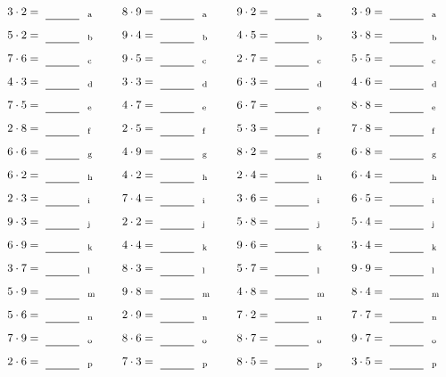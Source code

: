 \documentclass
[
  draft    = true,
  fontsize = 11pt,
  parskip  = half-
]
{scrartcl}
\begin{document}
\par\vfill\par
\begin{align*}
    \pline{3\cdot2}&=\rline{a}
  & \pline{8\cdot9}&=\rline{a}
  & \pline{9\cdot2}&=\rline{a}
  & \pline{3\cdot9}&=\rline{a} \\[1ex]
    \pline{5\cdot2}&=\rline{b}
  & \pline{9\cdot4}&=\rline{b}
  & \pline{4\cdot5}&=\rline{b}
  & \pline{3\cdot8}&=\rline{b} \\[1ex]
    \pline{7\cdot6}&=\rline{c}
  & \pline{9\cdot5}&=\rline{c}
  & \pline{2\cdot7}&=\rline{c}
  & \pline{5\cdot5}&=\rline{c} \\[1ex]
    \pline{4\cdot3}&=\rline{d}
  & \pline{3\cdot3}&=\rline{d}
  & \pline{6\cdot3}&=\rline{d}
  & \pline{4\cdot6}&=\rline{d} \\[1ex]
    \pline{7\cdot5}&=\rline{e}
  & \pline{4\cdot7}&=\rline{e}
  & \pline{6\cdot7}&=\rline{e}
  & \pline{8\cdot8}&=\rline{e} \\[1ex]
    \pline{2\cdot8}&=\rline{f}
  & \pline{2\cdot5}&=\rline{f}
  & \pline{5\cdot3}&=\rline{f}
  & \pline{7\cdot8}&=\rline{f} \\[1ex]
    \pline{6\cdot6}&=\rline{g}
  & \pline{4\cdot9}&=\rline{g}
  & \pline{8\cdot2}&=\rline{g}
  & \pline{6\cdot8}&=\rline{g} \\[1ex]
    \pline{6\cdot2}&=\rline{h}
  & \pline{4\cdot2}&=\rline{h}
  & \pline{2\cdot4}&=\rline{h}
  & \pline{6\cdot4}&=\rline{h} \\[1ex]
    \pline{2\cdot3}&=\rline{i}
  & \pline{7\cdot4}&=\rline{i}
  & \pline{3\cdot6}&=\rline{i}
  & \pline{6\cdot5}&=\rline{i} \\[1ex]
    \pline{9\cdot3}&=\rline{j}
  & \pline{2\cdot2}&=\rline{j}
  & \pline{5\cdot8}&=\rline{j}
  & \pline{5\cdot4}&=\rline{j} \\[1ex]
    \pline{6\cdot9}&=\rline{k}
  & \pline{4\cdot4}&=\rline{k}
  & \pline{9\cdot6}&=\rline{k}
  & \pline{3\cdot4}&=\rline{k} \\[1ex]
    \pline{3\cdot7}&=\rline{l}
  & \pline{8\cdot3}&=\rline{l}
  & \pline{5\cdot7}&=\rline{l}
  & \pline{9\cdot9}&=\rline{l} \\[1ex]
    \pline{5\cdot9}&=\rline{m}
  & \pline{9\cdot8}&=\rline{m}
  & \pline{4\cdot8}&=\rline{m}
  & \pline{8\cdot4}&=\rline{m} \\[1ex]
    \pline{5\cdot6}&=\rline{n}
  & \pline{2\cdot9}&=\rline{n}
  & \pline{7\cdot2}&=\rline{n}
  & \pline{7\cdot7}&=\rline{n} \\[1ex]
    \pline{7\cdot9}&=\rline{o}
  & \pline{8\cdot6}&=\rline{o}
  & \pline{8\cdot7}&=\rline{o}
  & \pline{9\cdot7}&=\rline{o} \\[1ex]
    \pline{2\cdot6}&=\rline{p}
  & \pline{7\cdot3}&=\rline{p}
  & \pline{8\cdot5}&=\rline{p}
  & \pline{3\cdot5}&=\rline{p}
\end{align*}
\end{document}
